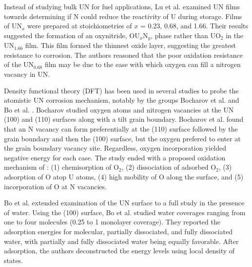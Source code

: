 \documentclass[11pt]{article}
\begin{document}
\begin{multicols}{2}
 Instead of studying bulk UN for fuel applications, Lu et al. \cite{Lu2016} examined UN films towards determining if N could reduce the reactivity of U during storage.  Films of UN$_{x}$ were prepared at stoichiometries of $x$ = 0.23, 0.68, and 1.66. Their results suggested the formation of an oxynitride, OU$_{x}$N$_{y}$, phase rather than UO$_{2}$ in the UN$_{1.66}$ film. This film formed the thinnest oxide layer, suggesting the greatest resistance to corrosion. The authors reasoned that the poor oxidation resistance of the UN$_{0.68}$ film may be due to the ease with which oxygen can fill a nitrogen vacancy in UN.
\par 
Density functional theory (DFT) has been used in several studies to probe the atomistic UN corrosion mechanism, notably by the groups Bocharov et al. \cite{Bocharov2013} and Bo et al. \cite{Bo2016}. Bocharov studied oxygen atoms and nitrogen vacancies at the UN (100) and (110) surfaces along with a tilt grain boundary. Bocharov et al. found that an N vacancy can form preferentially at the (110) surface followed by the grain boundary and then the (100) surface, but the oxygen prefered to enter at the grain boundary vacancy site. Regardless, oxygen incorporation yielded negative energy for each case. The study ended with a proposed oxidation mechanism of \cite{Bocharov2013}: 
	(1) chemisorption of O$_{2}$,
	(2) dissociation of adsorbed O$_{2}$,
	(3) adsorption of O atop U atoms,
	(4) high mobility of O along the surface, and
	(5) incorporation of O at N vacancies.
\par 
Bo et al. \cite{Bo2016} extended examination of the UN surface to a full study in the presence of water. Using the (100) surface, Bo et al. studied water coverages ranging from one to four molecules (0.25 to 1 monolayer coverage). They reported the adsorption energies for molecular, partially dissociated, and fully dissociated water, with partially and fully dissociated water being equally favorable. After adsorption, the authors deconstructed the energy levels using local density of states. 
\begin{figure}[h]


\end{figure}
\end{multicols}
\end{document}
